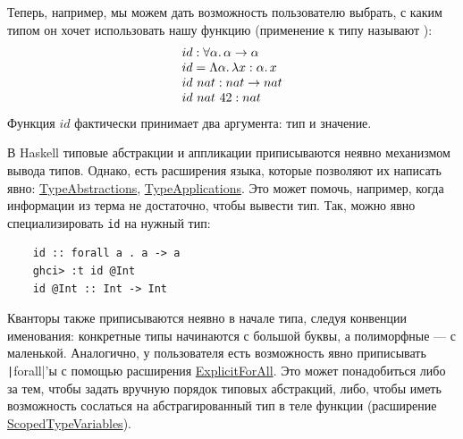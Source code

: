 
Теперь, например, мы можем дать возможность пользователю выбрать, с каким типом он хочет использовать нашу функцию (применение к типу называют ):
\[
    \begin{array}{ll}
        id : \forall\alpha\ldotp\alpha\to\alpha            \\
        id = \Lambda\alpha\ldotp\lambda x : \alpha\ldotp x \\
        id ~ nat : nat \to nat                           \\
        id~ nat ~ 42 : nat
    \end{array}
\]
Функция $id$ фактически принимает два аргумента: тип и значение.

В Haskell типовые абстракции и аппликации приписываются неявно механизмом вывода типов.
Однако, есть расширения языка, которые позволяют их написать явно: \href{https://downloads.haskell.org/ghc/latest/docs/users_guide/exts/type_abstractions.html}{TypeAbstractions}, \href{https://downloads.haskell.org/ghc/latest/docs/users_guide/exts/type_applications.html}{TypeApplications}.
Это может помочь, например, когда информации из терма не достаточно, чтобы вывести тип.
Так, можно явно специализировать \texttt{id} на нужный тип:
\begin{verbatim}
    id :: forall a . a -> a
    ghci> :t id @Int
    id @Int :: Int -> Int
\end{verbatim}

Кванторы также приписываются неявно в начале типа, следуя конвенции именования: конкретные типы начинаются с большой буквы, а полиморфные --- с маленькой.
Аналогично, у пользователя есть возможность явно приписывать \texttt|forall|'ы с помощью расширения \href{https://downloads.haskell.org/ghc/latest/docs/users_guide/exts/explicit_forall.html\#extension-ExplicitForAll}{ExplicitForAll}.
Это может понадобиться либо за тем, чтобы задать вручную порядок типовых абстракций, либо, чтобы иметь возможность сослаться на абстрагированный тип в теле функции (расширение \href{https://downloads.haskell.org/ghc/latest/docs/users_guide/exts/scoped_type_variables.html#extension-ScopedTypeVariables}{ScopedTypeVariables}).

